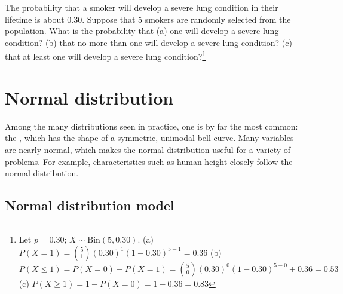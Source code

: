 \begin{exercise}
	The probability that a smoker will develop a severe lung condition in their lifetime is about 0.30. Suppose that 5 smokers are randomly selected from the population. What is the probability that (a) one will develop a severe lung condition? (b) that no more than one will develop a severe lung condition? (c) that at least one will develop a severe lung condition?\footnote{Let $p = 0.30$; $X \sim \textrm{Bin}(5, 0.30)$. (a) $P(X=1) = {5 \choose 1}(0.30)^1(1-0.30)^{5-1} = 0.36$ (b) $P(X \leq 1) = P(X=0) + P(X=1) = {5 \choose 0}(0.30)^0(1-0.30)^{5-0} + 0.36 = 0.53$ (c) $P(X \geq 1) = 1 - P(X=0) = 1 - 0.36 = 0.83$}	
\end{exercise}





\newpage

\section{Normal distribution}
\label{normalDist}

Among the many distributions seen in practice, one is by far the most common: the , which has the shape of a symmetric, unimodal bell curve. Many variables are nearly normal, which makes the normal distribution useful for a variety of problems. For example, characteristics such as human height closely follow the normal distribution.

\subsection{Normal distribution model}

